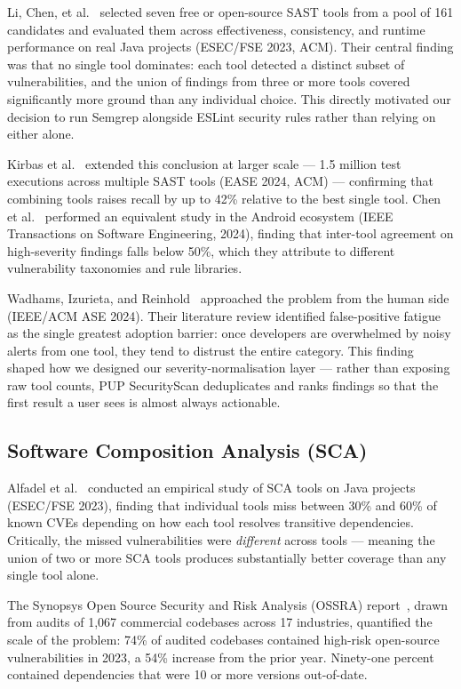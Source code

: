 \documentclass[12pt,a4paper]{report}
\begin{document}
Li, Chen, et al.~\cite{li2023} selected seven free or open-source SAST tools from a pool of 161 candidates and evaluated them across effectiveness, consistency, and runtime performance on real Java projects (ESEC/FSE 2023, ACM). Their central finding was that no single tool dominates: each tool detected a distinct subset of vulnerabilities, and the union of findings from three or more tools covered significantly more ground than any individual choice. This directly motivated our decision to run Semgrep alongside ESLint security rules rather than relying on either alone.

Kirbas et al.~\cite{kirbas2024} extended this conclusion at larger scale --- 1.5 million test executions across multiple SAST tools (EASE 2024, ACM) --- confirming that combining tools raises recall by up to 42\% relative to the best single tool. Chen et al.~\cite{chen2024android} performed an equivalent study in the Android ecosystem (IEEE Transactions on Software Engineering, 2024), finding that inter-tool agreement on high-severity findings falls below 50\%, which they attribute to different vulnerability taxonomies and rule libraries.

Wadhams, Izurieta, and Reinhold~\cite{wadhams2024} approached the problem from the human side (IEEE/ACM ASE 2024). Their literature review identified false-positive fatigue as the single greatest adoption barrier: once developers are overwhelmed by noisy alerts from one tool, they tend to distrust the entire category. This finding shaped how we designed our severity-normalisation layer --- rather than exposing raw tool counts, PUP SecurityScan deduplicates and ranks findings so that the first result a user sees is almost always actionable.

\subsection{Software Composition Analysis (SCA)}

Alfadel et al.~\cite{alfadel2023} conducted an empirical study of SCA tools on Java projects (ESEC/FSE 2023), finding that individual tools miss between 30\% and 60\% of known CVEs depending on how each tool resolves transitive dependencies. Critically, the missed vulnerabilities were \emph{different} across tools --- meaning the union of two or more SCA tools produces substantially better coverage than any single tool alone.

The Synopsys Open Source Security and Risk Analysis (OSSRA) report~\cite{synopsys2024}, drawn from audits of 1,067 commercial codebases across 17 industries, quantified the scale of the problem: 74\% of audited codebases contained high-risk open-source vulnerabilities in 2023, a 54\% increase from the prior year. Ninety-one percent contained dependencies that were 10 or more versions out-of-date.
\end{document}
